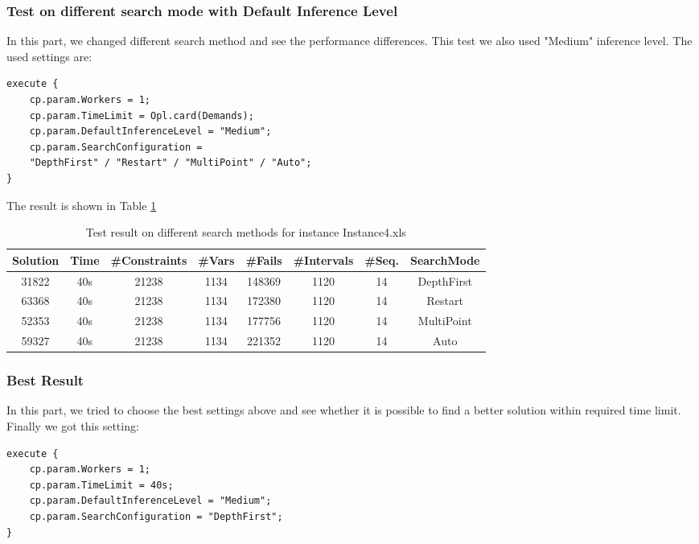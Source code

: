 \documentclass[a4paper, 12pt]{article}
\begin{document}
\subsubsection{Test on different search mode with Default Inference Level}

In this part, we changed different search method and see the performance differences. This test we also used "Medium" inference level. The used settings are: 

\begin{lstlisting}
execute {
    cp.param.Workers = 1;
    cp.param.TimeLimit = Opl.card(Demands); 
    cp.param.DefaultInferenceLevel = "Medium";
    cp.param.SearchConfiguration = 
    "DepthFirst" / "Restart" / "MultiPoint" / "Auto";
}
\end{lstlisting}

The result is shown in Table \ref{diffSear4}

\begin{table}
    \centering
    \caption{Test result on different search methods for instance Instance4.xls}
    \label{diffSear4}
    \begin{tabular}{|c|c|c|c|c|c|c|c|}
        \hline
        Solution & Time & \#Constraints & \#Vars & \#Fails & \#Intervals & \#Seq. & SearchMode \\
        \hline
        31822 & 40s & 21238 & 1134 & 148369 & 1120 & 14 & DepthFirst \\
        \hline 
        63368 & 40s & 21238 & 1134 & 172380 & 1120 & 14 & Restart \\
        \hline
        52353 & 40s & 21238 & 1134 & 177756 & 1120 & 14 & MultiPoint \\
        \hline
        59327 & 40s & 21238 & 1134 & 221352 & 1120 & 14 & Auto \\
        \hline
    \end{tabular}
\end{table}

\subsubsection{Best Result}

In this part, we tried to choose the best settings above and see whether it is possible to find a better solution within required time limit. Finally we got this setting: 

\begin{lstlisting}
execute {
    cp.param.Workers = 1;
    cp.param.TimeLimit = 40s; 
    cp.param.DefaultInferenceLevel = "Medium";
    cp.param.SearchConfiguration = "DepthFirst";
}
\end{lstlisting}
\end{document}
